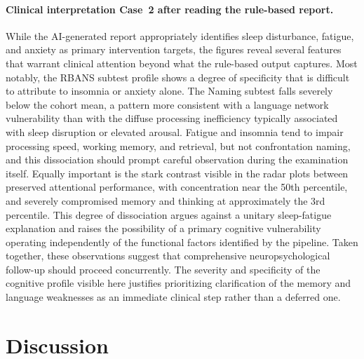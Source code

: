 \documentclass[11pt,a4paper]{article}
\begin{document}
\paragraph{Clinical interpretation Case~2 after reading the rule-based report.}
While the AI-generated report appropriately identifies sleep disturbance, fatigue, and anxiety as primary intervention targets, the figures reveal several features that warrant clinical attention beyond what the rule-based output captures. Most notably, the RBANS subtest profile shows a degree of specificity that is difficult to attribute to insomnia or anxiety alone. The Naming subtest falls severely below the cohort mean, a pattern more consistent with a language network vulnerability than with the diffuse processing inefficiency typically associated with sleep disruption or elevated arousal. Fatigue and insomnia tend to impair processing speed, working memory, and retrieval, but not confrontation naming, and this dissociation should prompt careful observation during the examination itself.
Equally important is the stark contrast visible in the radar plots between preserved attentional performance, with concentration near the 50th percentile, and severely compromised memory and thinking at approximately the 3rd percentile. This degree of dissociation argues against a unitary sleep-fatigue explanation and raises the possibility of a primary cognitive vulnerability operating independently of the functional factors identified by the pipeline.
Taken together, these observations suggest that comprehensive neuropsychological follow-up should proceed concurrently. The severity and specificity of the cognitive profile visible here justifies prioritizing clarification of the memory and language weaknesses as an immediate clinical step rather than a deferred one.


\section{Discussion}
\label{sec:discussion}
\end{document}
